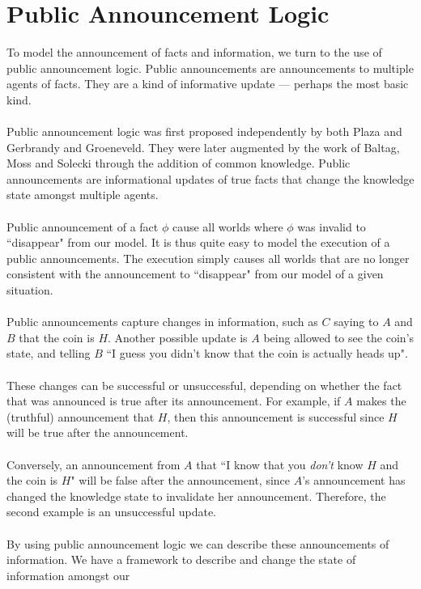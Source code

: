 \documentclass[12pt, a4paper, titlepage]{scrartcl}
\begin{document}
\section{Public Announcement Logic}\label{pal}
To model the announcement of facts and information, we turn to the use of public
announcement logic.
Public announcements are announcements to multiple agents of facts.
They are a kind of informative update --- perhaps the most basic kind.\\
\\
Public announcement logic was first proposed independently by both Plaza and
Gerbrandy and Groeneveld. \citep{plaza2007public,gelbrandy1997reasoning}
They were later augmented by the work of Baltag, Moss and Solecki through the
addition of common knowledge. \citep{baltag1998lpa}
Public announcements are informational updates of true facts that change the
knowledge state amongst multiple agents.\\
\\
Public announcement of a fact $\phi$ cause all worlds where $\phi$ was
invalid to ``disappear" from our model.
It is thus quite easy to model the execution of a public announcements.
The execution simply causes all worlds that are no longer consistent with the
announcement to ``disappear" from our model of a given situation.\\
\\
Public announcements capture changes in information, such as $C$ saying to
$A$ and $B$ that the coin is $H$.
Another possible update is $A$ being allowed to see the coin's state, and
telling $B$ ``I guess you didn't know that the coin is actually heads up".\\
\\
These changes can be successful or unsuccessful, depending on whether the fact
that was announced is true after its announcement.
For example, if $A$ makes the (truthful) announcement that $H$, then this
announcement is successful since $H$ will be true after the announcement.\\
\\
Conversely, an announcement from $A$ that ``I know that you {\em don't} know $H$
and the coin is $H$" will be false after the announcement, since $A$'s
announcement has changed the knowledge state to invalidate her
announcement.
Therefore, the second example is an unsuccessful update.\\
\\
By using public announcement logic we can describe these announcements of
information.
We have a framework to describe and change the state of information amongst our
\end{document}

